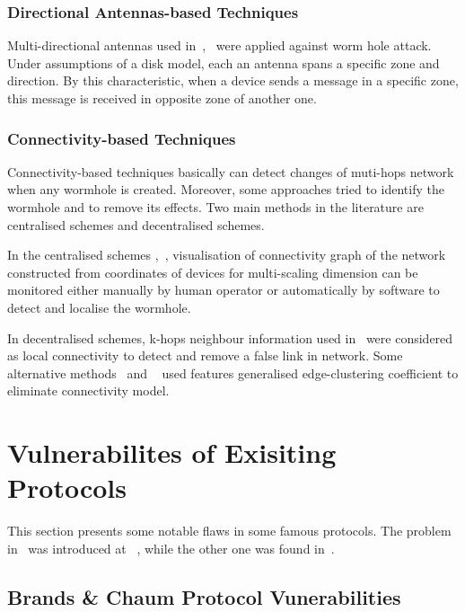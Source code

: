 \subsubsection*{Directional Antennas-based Techniques}

Multi-directional antennas used in~\cite{Hu04usingdirectional},~\cite{RuiZhang2010} were applied against worm hole attack. Under assumptions of a disk model, each an antenna spans a specific zone and direction. By this characteristic, when a device sends a message in a specific zone, this message is received in opposite zone of another one. 

\subsubsection*{Connectivity-based Techniques}

Connectivity-based techniques basically can detect changes of muti-hops network when any wormhole is created. Moreover, some approaches tried to identify the wormhole and to remove its effects. Two main methods in the literature are centralised schemes and decentralised schemes. 

In the centralised schemes \cite{RuiZhang2010},~\cite{WeichaoWang2007}, visualisation of connectivity graph of the network constructed from coordinates of devices for multi-scaling dimension can be monitored either manually by human operator or automatically by software to detect and localise the wormhole. 

In decentralised schemes, k-hops neighbour information used in~\cite{RiteshMaheshwari}\cite{4699583} were considered as local connectivity to detect and remove a false link in network. Some alternative methods~\cite{RiteshMaheshwari} and ~\cite{5993472} used features generalised edge-clustering coefficient to eliminate connectivity model.

\section{Vulnerabilites of Exisiting Protocols}

This section presents some notable flaws in some famous protocols. The problem in~\cite{Brands:1994aa} was introduced at ~\cite{6234408}, while the other one was found in~\cite{lin2006}. 

\subsection{Brands \& Chaum Protocol Vunerabilities}

